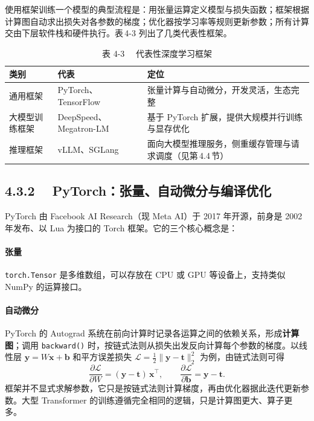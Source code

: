 \documentclass{article}
\begin{document}
使用框架训练一个模型的典型流程是：用张量运算定义模型与损失函数；框架根据计算图自动求出损失对各参数的梯度；优化器按学习率等规则更新参数；所有计算交由下层软件栈和硬件执行。表\,4-3 列出了几类代表性框架。

\begin{table}[htbp]
\centering
\caption{表 4-3　 代表性深度学习框架}

\begin{tabular}{l l l}
\toprule
类别 & 代表 & 定位 \\
\midrule
通用框架 & PyTorch、TensorFlow & 张量计算与自动微分，开发灵活，生态完整 \\
大模型训练框架 & DeepSpeed、Megatron-LM & 基于 PyTorch 扩展，提供大规模并行训练与显存优化 \\
推理框架 & vLLM、SGLang & 面向大模型推理服务，侧重缓存管理与请求调度（见第\,4.4\,节） \\
\bottomrule
\end{tabular}
\end{table}

\subsection*{4.3.2　 PyTorch：张量、自动微分与编译优化}


PyTorch 由 Facebook AI Research（现 Meta AI）于 2017 年开源，前身是 2002 年发布、以 Lua 为接口的 Torch 框架\cite{paszke2019pytorch}。它的三个核心概念是：

\paragraph{张量} \texttt{torch.Tensor} 是多维数组，可以存放在 CPU 或 GPU 等设备上，支持类似 NumPy 的运算接口。

\paragraph{自动微分} PyTorch 的 Autograd 系统在前向计算时记录各运算之间的依赖关系，形成\textbf{计算图}；调用 \texttt{backward()} 时，按链式法则从损失出发反向计算每个参数的梯度。以线性层 $\boldsymbol{y}=W\boldsymbol{x}+\boldsymbol{b}$ 和平方误差损失 $\mathcal{L}=\tfrac12\lVert\boldsymbol{y}-\boldsymbol{t}\rVert_2^2$ 为例，由链式法则可得
\[
\frac{\partial\mathcal{L}}{\partial W} = (\boldsymbol{y}-\boldsymbol{t})\,\boldsymbol{x}^{\top},\qquad
  \frac{\partial\mathcal{L}}{\partial \boldsymbol{b}} = \boldsymbol{y}-\boldsymbol{t}. \tag{4-5}
\]
框架并不显式求解参数，它只是按链式法则计算梯度，再由优化器据此迭代更新参数。大型 Transformer 的训练遵循完全相同的逻辑，只是计算图更大、算子更多。
\end{document}
